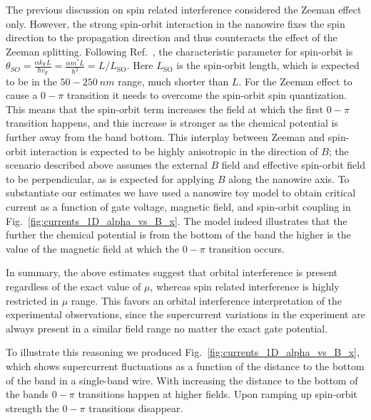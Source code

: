 \documentclass[english, aps,prb,showpacs,preprintnumber,amsmath,amssymb,superscriptaddress,reprint]{revtex4-1}
\begin{document}
The previous discussion on spin related interference considered the Zeeman effect only.
However, the strong spin-orbit interaction in the nanowire fixes the spin direction to the propagation direction and thus counteracts the effect of the Zeeman splitting. 
Following Ref.~, the characteristic parameter for spin-orbit is $\theta_{SO} = \frac{\alpha k_\mathrm{F} L}{\hbar v_\mathrm{F}} = \frac{\alpha m^* L}{\hbar^2} = L/L_\mathrm{SO}$.
Here $L_\mathrm{SO}$ is the spin-orbit length, which is expected to be in the $50-\SI{250}{nm}$ range, much shorter than $L$.
For the Zeeman effect to cause a $0-\pi$ transition it needs to overcome the spin-orbit spin quantization. 
This means that the spin-orbit term increases the field at which the first $0-\pi$ transition happens, and this increase is stronger as the chemical potential is further away from the band bottom.
This interplay between Zeeman and spin-orbit interaction is expected to be highly anisotropic\cite{yokoyama2014anomalous} in the direction of $B$; the scenario described above assumes the external $B$ field and effective spin-orbit field to be perpendicular, as is expected for applying $B$ along the nanowire axis.
To substantiate our estimates we have used a nanowire toy model\cite{lutchyn2010majorana,oreg2010helical} to obtain critical current as a function of gate voltage, magnetic field, and spin-orbit coupling in Fig.~\ref{fig:currents_1D_alpha_vs_B_x}.
The model indeed illustrates that the further the chemical potential is from the bottom of the band the higher is the value of the magnetic field at which the $0-\pi$ transition occurs. 

In summary, the above estimates suggest that orbital interference is present regardless of the exact value of $\mu$, whereas spin related interference is highly restricted in $\mu$ range.
This favors an orbital interference interpretation of the experimental observations, since the supercurrent variations in the experiment are always present in a similar field range no matter the exact gate potential.

To illustrate this reasoning we produced Fig.~\ref{fig:currents_1D_alpha_vs_B_x}, which shows supercurrent fluctuations as a function of the distance to the bottom of the band in a single-band wire. With increasing the distance to the bottom of the bands $0-\pi$ transitions happen at higher fields. Upon ramping up spin-orbit strength the $0-\pi$ transitions disappear.
\end{document}
